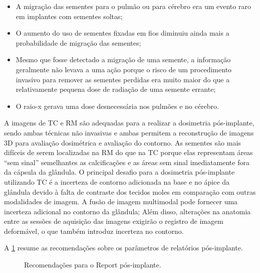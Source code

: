 \documentclass[11pt,a4paper]{article}
\begin{document}
	\begin{itemize}[label=\textcolor{CarnationPink}{$\blacktriangleright$}]
		\item A migração das sementes para o pulmão ou para cérebro era um evento raro em implantes com sementes soltas;
		\item O aumento do uso de sementes fixadas em fios diminuiu ainda mais a probabilidade de migração das sementes;
		\item Mesmo que fosse detectado a migração de uma semente, a informação geralmente não levava a uma ação porque o risco de um procedimento invasivo para remover as sementes perdidas era muito maior do que a relativamente pequena dose de radiação de uma semente errante;
		\item O raio-x gerava uma dose desnecessária nos pulmões e no cérebro.
	\end{itemize}

	A imagens de TC e RM são adequadas para a realizar a dosimetria pós-implante, sendo ambas técnicas não invasivas e ambas permitem a reconstrução de imagens 3D para avaliação dosimétrica e avaliação do contorno. As sementes são mais difíceis de serem localizadas na RM do que na TC porque elas representam áreas “sem sinal” semelhantes as calcificações e as áreas sem sinal imediatamente fora da cápsula da glândula. O principal desafio para a dosimetria pós-implante utilizando TC é a incerteza de contorno adicionada na base e no ápice da glândula devido à falta de contraste dos tecidos moles em comparação com outras modalidades de imagem. A fusão de imagem multimodal pode fornecer uma incerteza adicional no contorno da glândula; Além disso, alterações na anatomia entre as sessões de aquisição das imagens exigirão o registro de imagem deformável, o que também introduz incerteza no contorno.

	A \ref{fig:RecomendacoesPosImplanteProstata} resume as recomendações sobre os parâmetros de relatórios pós-implante.

	\begin{figure}[h]
		\centering
		\caption{Recomendações para o Report pós-implante.}
		\label{fig:RecomendacoesPosImplanteProstata}
	\end{figure}
\end{document}
